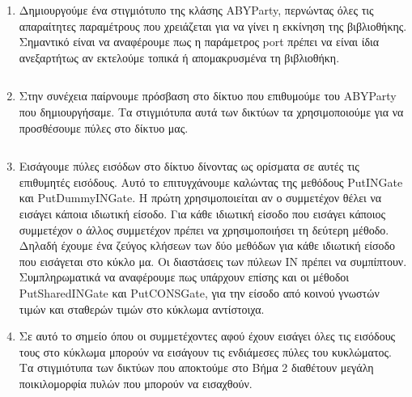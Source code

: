 \begin{enumerate}
    \item Δημιουργούμε ένα στιγμιότυπο της κλάσης ABYParty, περνώντας όλες τις απαραίτητες παραμέτρους που χρειάζεται για να γίνει η εκκίνηση της βιβλιοθήκης. Σημαντικό είναι να αναφέρουμε πως η παράμετρος port πρέπει να είναι ίδια ανεξαρτήτως αν εκτελούμε τοπικά ή απομακρυσμένα τη βιβλιοθήκη.
    \begin{figure}[h!]
        \begin{center}
            \inputminted[fontsize=\scriptsize,frame=single]{cpp}{./01_body/code/aby-example-step-1.cpp}
        \end{center}
    \end{figure}
    \item Στην συνέχεια παίρνουμε πρόσβαση στο δίκτυο που επιθυμούμε του ABYParty που δημιουργήσαμε. Τα στιγμιότυπα αυτά των δικτύων τα χρησιμοποιούμε για να προσθέσουμε πύλες στο δίκτυο μας.
    \begin{figure}[h!]
                  \begin{center}
                      \inputminted[fontsize=\scriptsize,frame=single]{cpp}{./01_body/code/aby-example-step-2.cpp}
                  \end{center}
    \end{figure}
    \item Εισάγουμε πύλες εισόδων στο δίκτυο δίνοντας ως ορίσματα σε αυτές τις επιθυμητές εισόδους. Αυτό το επιτυγχάνουμε καλώντας της μεθόδους PutINGate και PutDummyINGate. Η πρώτη χρησιμοποιείται αν ο συμμετέχον θέλει να εισάγει κάποια ιδιωτική είσοδο. Για κάθε ιδιωτική είσοδο που εισάγει κάποιος συμμετέχον ο άλλος συμμετέχον πρέπει να χρησιμοποιήσει τη δεύτερη μέθοδο. Δηλαδή έχουμε ένα ζεύγος κλήσεων των δύο μεθόδων για κάθε ιδιωτική είσοδο που εισάγεται στο κύκλο μα. Οι διαστάσεις των πύλεων IN πρέπει να συμπίπτουν. Συμπληρωματικά να αναφέρουμε πως υπάρχουν επίσης και οι μέθοδοι PutSharedINGate και PutCONSGate, για την είσοδο από κοινού γνωστών τιμών και σταθερών τιμών στο κύκλωμα αντίστοιχα.
    \item Σε αυτό το σημείο όπου οι συμμετέχοντες αφού έχουν εισάγει όλες τις εισόδους τους στο κύκλωμα μπορούν να εισάγουν τις ενδιάμεσες πύλες του κυκλώματος. Τα στιγμιότυπα των δικτύων που αποκτούμε στο Βήμα 2 διαθέτουν μεγάλη ποικιλομορφία πυλών που μπορούν να εισαχθούν.
    \begin{figure}[h!]
        \begin{center}
            \inputminted[fontsize=\scriptsize,frame=single]{cpp}{./01_body/code/aby-example-step-4.cpp}

\end{center}
\end{figure}
\end{enumerate}
